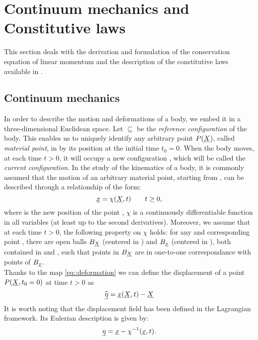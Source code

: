 \section{Continuum mechanics and Constitutive laws} This section deals
with the derivation and formulation of the conservation equation of
linear momentum and the description of the constitutive laws available
in \LV.

\subsection{Continuum mechanics}
\label{sct-Continuum} In order to describe the motion and deformations
of a body, we embed it in a three-dimensional Euclidean space. Let
\RefCon $\subseteq$ \Real be the \textit{reference configuration} of
the body. This enables us to uniquely identify any arbitrary point
$P(\underline{X})$, called \textit{material point}, in \RefCon by its position
at the initial time $t_0=0$. When the body moves, at each time $t>0$,
it will occupy a new configuration \CurCon, which will be called the
\textit{current configuration}. In the study of the kinematics of a
body, it is commonly assumed that the motion of an arbitrary material
point, starting from \pos, can be described through a relationship of
the form:
\begin{equation}
  \underline{x}=\chi(\underline{X},t)\qquad t\geq0,
  \label{eq::deformation}
\end{equation}
where \npos is the new position of the point \pos,
$\chi$ is a continuously differentiable function in all variables (at
least up to the second derivatives). Moreover, we assume that at each
time $t>0$, the following property on $\chi$ holds: for any \pos and
corresponding point \npos, there are open balls $B_{\underline{X}}$ (centered
in \pos) and $B_{\underline{x}}$ (centered in \npos), both contained in
\RefCon and \CurCon, such that points in $B_{\underline{X}}$ are in one-to-one
correspondance with points of $B_{\underline{x}}$.\\ Thanks to the map
\eqref{eq::deformation} we can define the displacement of a point
$P(\underline{X},t_0=0)$ at time $t>0$ as
\begin{equation}
  \widehat{\underline{\eta}}=\underline{x}(\underline{X},t)-\underline{X}
  \label{eq::displacementL}
\end{equation}
It is worth noting that the displacement field has
been defined in the Lagrangian framework. Its Eulerian description is
given by:
\begin{equation}
  \underline{\eta}=\underline{x}-\chi^{-1}(\underline{x},t).
  \label{eq::displacementE}
\end{equation}
